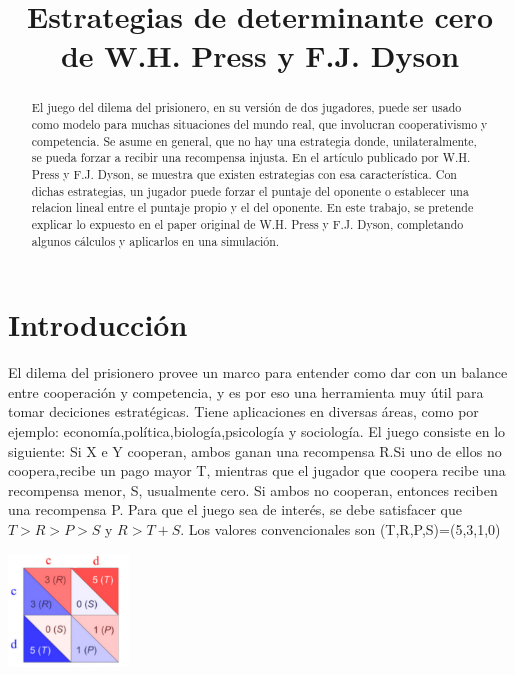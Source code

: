 \documentclass[12pt]{article}
\title{Estrategias de determinante cero de W.H. Press y F.J. Dyson}
\date{}
\begin{document}
\maketitle

\begin{abstract}
El juego del dilema del prisionero, en su versión de dos jugadores, puede ser usado como modelo para 
muchas situaciones del mundo real, que involucran cooperativismo y competencia. Se asume en general, que no hay 
una estrategia donde, unilateralmente, se pueda forzar a recibir una recompensa injusta.\newline
En el artículo publicado por W.H. Press y F.J. Dyson, se muestra que existen estrategias con esa característica.
Con dichas estrategias, un jugador puede forzar el puntaje del oponente o establecer una relacion lineal entre
el puntaje propio y el del oponente.\newline
En este trabajo, se pretende explicar lo expuesto en el paper original de W.H. Press y F.J. Dyson, completando
algunos cálculos y aplicarlos en una simulación.
\end{abstract}




\section{Introducción}
El dilema del prisionero provee un  marco para entender como dar con un balance entre cooperación y competencia, y es
por eso una herramienta muy útil para tomar deciciones estratégicas.
Tiene aplicaciones en diversas áreas, como por ejemplo: economía,política,biología,psicología y sociología.\newline
El juego consiste en lo siguiente:\newline
Si X e Y cooperan, ambos ganan una recompensa R.Si uno de ellos no coopera,recibe un pago mayor T, mientras que el
jugador que coopera recibe una recompensa menor, S, usualmente cero. Si ambos no cooperan, entonces reciben una recompensa P.
Para que el juego sea de interés, se debe satisfacer que $T >  R > P > S$ y $R > T+S$.
Los valores convencionales son (T,R,P,S)=(5,3,1,0)
\begin{center}
\includegraphics[height=3cm]{./pd.png}
\end{center}
\end{document}
